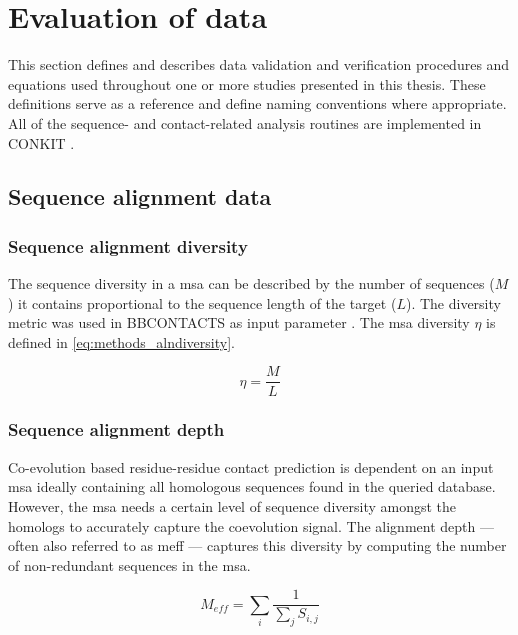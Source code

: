 \section{Evaluation of data}
This section defines and describes data validation and verification procedures and equations used throughout one or more studies presented in this thesis. These definitions serve as a reference and define naming conventions where appropriate. All of the sequence- and contact-related analysis routines are implemented in CONKIT \cite{Simkovic2017-us}.

\subsection{Sequence alignment data}
\subsubsection{Sequence alignment diversity}
The sequence diversity in a \gls{msa} can be described by the number of sequences ($M$) it contains proportional to the sequence length of the target ($L$). The diversity metric was used in BBCONTACTS as input parameter \cite{Andreani2015-qn}. The \gls{msa} diversity $\eta$ is defined in \cref{eq:methods_alndiversity}.

\begin{equation}
    \eta=\frac{M}{L}
    \label{eq:methods_alndiversity}
\end{equation}

\subsubsection{Sequence alignment depth}
Co-evolution based residue-residue contact prediction is dependent on an input \gls{msa} ideally containing all homologous sequences found in the queried database. However, the \gls{msa} needs a certain level of sequence diversity amongst the homologs to accurately capture the coevolution signal. The alignment depth --- often also referred to as \gls{meff} --- captures this diversity by computing the number of non-redundant sequences in the \gls{msa}.

\begin{equation}
    M_{eff}=\sum_{i}\frac{1}{\sum_{j}S_{i,j}}
    \label{eq:methods_meff}
\end{equation}

